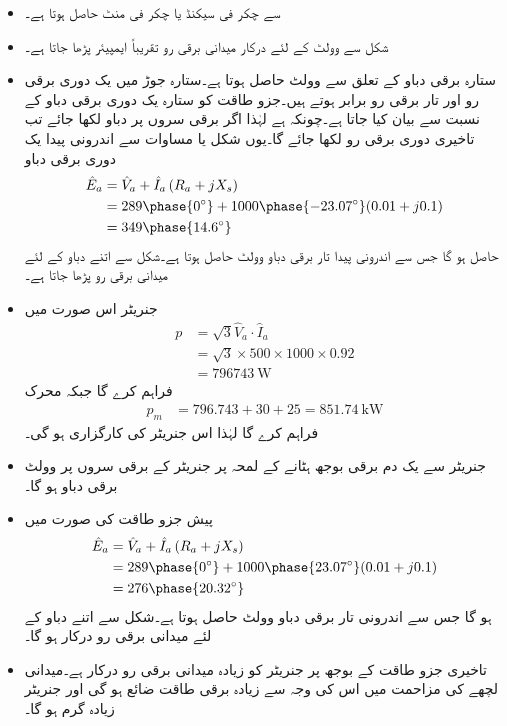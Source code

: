 \begin{itemize}
\item
{} سے  چکر فی سیکنڈ یا  چکر فی منٹ حاصل ہوتا ہے۔
\item
شکل   سے    وولٹ کے لئے درکار میدانی برقی رو تقریباً  ایمپیئر پڑھا جاتا  ہے۔
\item
ستارہ برقی دباو کے تعلق  سے   وولٹ حاصل ہوتا ہے۔ستارہ جوڑ میں یک دوری برقی رو اور تار برقی رو برابر ہوتے ہیں۔جزو طاقت کو ستارہ یک دوری برقی دباو کے نسبت سے بیان کیا جاتا ہے۔چونکہ  ہے لہٰذا اگر برقی سروں پر دباو  لکھا جائے تب تاخیری دوری برقی رو   لکھا جائے گا۔یوں شکل  یا مساوات  سے اندرونی پیدا یک دوری برقی دباو
\begin{align*}
\hat{E}_a&=\hat{V}_{a}+\hat{I}_a \left(R_a+j X_s \right)\\
&= 289\phase{0 ^{\circ}}+1000 \phase {-23.07 ^{\circ}} ( 0.01 +j 0.1)\\
&=349\phase{14.6 ^{\circ}}
\end{align*}
حاصل ہو گا جس سے اندرونی پیدا تار برقی دباو  وولٹ حاصل ہوتا ہے۔شکل  سے اتنے دباو کے لئے   میدانی برقی رو پڑھا جاتا ہے۔
\item
جنریٹر اس صورت میں
\begin{align*}
p&=\sqrt{3} \hat{V}_{a} \cdot \hat{I}_a\\
&=\sqrt{3} \times 500 \times 1000 \times 0.92\\
&=\SI{796743}{\watt}
\end{align*}
فراہم کرے گا  جبکہ محرک 
\begin{align*}
p_m&=796.743+30+25=\SI{851.74}{\kilo \watt}
\end{align*}
فراہم کرے گا  لہٰذا اس جنریٹر کی کارگزاری  ہو گی۔ 
\item
جنریٹر سے یک دم برقی بوجھ ہٹانے کے  لمحہ پر جنریٹر کے برقی سروں پر   وولٹ برقی دباو ہو گا۔
\item
پیش جزو طاقت کی صورت میں
\begin{align*}
\hat{E}_a&=\hat{V}_{a}+\hat{I}_a \left(R_a+j X_s \right)\\
&= 289\phase{0 ^{\circ}}+1000 \phase {23.07 ^{\circ}} ( 0.01 +j 0.1)\\
&=276\phase{20.32 ^{\circ}}
\end{align*}
ہو گا جس سے اندرونی  تار برقی دباو  وولٹ حاصل ہوتا ہے۔شکل  سے اتنے دباو کے لئے   میدانی برقی رو درکار ہو گا۔
\item
تاخیری جزو طاقت کے بوجھ پر جنریٹر کو زیادہ میدانی برقی رو درکار ہے۔میدانی لچھے کی مزاحمت میں اس کی وجہ سے زیادہ برقی طاقت ضائع ہو گی اور جنریٹر  زیادہ گرم ہو گا۔
\end{itemize}
